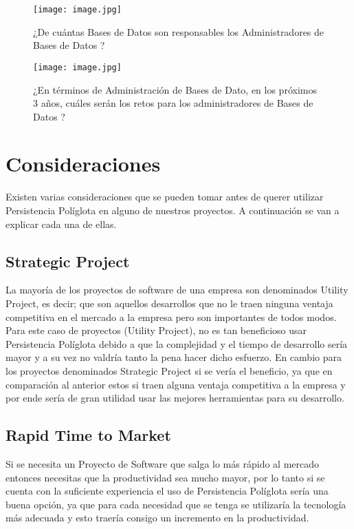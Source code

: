 \documentclass[conference,compsoc]{IEEEtran}
\begin{document}
\begin{figure}[!h]
\centering
\texttt{[image: image.jpg]}
\caption{¿De cuántas Bases de Datos son responsables los Administradores de Bases de Datos ? \cite{art14}}
\label{real_1}
\end{figure}
 
\begin{figure}[!h]
\centering
\texttt{[image: image.jpg]}
\caption{¿En términos de Administración de Bases de Dato, en los próximos 3 años, cuáles serán los retos para los administradores de Bases de Datos ? \cite{art14}}
\label{real_2}
\end{figure}

\section{Consideraciones}
Existen varias consideraciones que se pueden tomar antes de querer utilizar Persistencia Políglota en alguno de nuestros proyectos. A continuación se van a explicar cada una de ellas. 

\subsection{Strategic Project}
La mayoría de los proyectos de software de una empresa son denominados Utility Project, es decir; que son aquellos desarrollos que no le traen ninguna ventaja competitiva en el mercado a la empresa pero son importantes de todos modos. Para este caso de proyectos (Utility Project), no es tan beneficioso usar Persistencia Políglota debido a que la complejidad y el tiempo de desarrollo sería mayor y a su vez no valdría tanto la pena hacer dicho esfuerzo. En cambio para los proyectos denominados Strategic Project si se vería el beneficio, ya que en comparación al anterior estos si traen alguna ventaja competitiva a la empresa y por ende sería de gran utilidad usar las mejores herramientas para su desarrollo.
\subsection{Rapid Time to Market}
Si se necesita un Proyecto de Software que salga lo más rápido al mercado entonces necesitas que la productividad sea mucho mayor, por lo tanto si se cuenta con la suficiente experiencia el uso de Persistencia Políglota sería una buena opción, ya que para cada necesidad que se tenga se utilizaría la tecnología más adecuada y esto traería consigo un incremento en la productividad.
\end{document}
